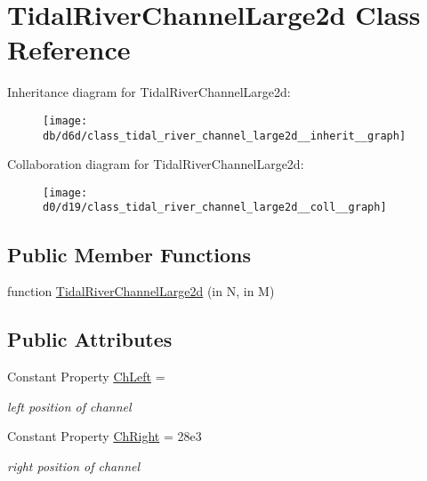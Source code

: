 \hypertarget{class_tidal_river_channel_large2d}{}\section{Tidal\+River\+Channel\+Large2d Class Reference}
\label{class_tidal_river_channel_large2d}


Inheritance diagram for Tidal\+River\+Channel\+Large2d\+:
\nopagebreak
\begin{figure}[H]
\begin{center}
\leavevmode
\texttt{[image: db/d6d/class\_tidal\_river\_channel\_large2d\_\_inherit\_\_graph]}
\end{center}
\end{figure}


Collaboration diagram for Tidal\+River\+Channel\+Large2d\+:
\nopagebreak
\begin{figure}[H]
\begin{center}
\leavevmode
\texttt{[image: d0/d19/class\_tidal\_river\_channel\_large2d\_\_coll\_\_graph]}
\end{center}
\end{figure}
\subsection*{Public Member Functions}
\begin{DoxyCompactItemize}
\item 
function \hyperlink{class_tidal_river_channel_large2d_a6c8be2fdd98643de352d929d9481b0d6}{Tidal\+River\+Channel\+Large2d} (in N, in M)
\end{DoxyCompactItemize}
\subsection*{Public Attributes}
\begin{DoxyCompactItemize}
\item 
Constant Property \hyperlink{class_tidal_river_channel_large2d_a3c12f6ce2777a89e264feb2013c2e6e9}{Ch\+Left} =
\begin{DoxyCompactList}\small\item\em left position of channel \end{DoxyCompactList}\item 
Constant Property \hyperlink{class_tidal_river_channel_large2d_a210e3b20bcb12be6d54122663051b242}{Ch\+Right} = 28e3
\begin{DoxyCompactList}\small\item\em right position of channel \end{DoxyCompactList}\end{DoxyCompactItemize}
